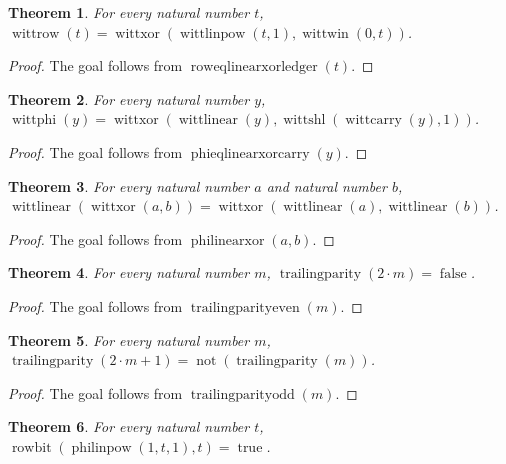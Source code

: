 \documentclass[11pt]{article}
\newtheorem{theorem}{Theorem}[section]
\theoremstyle{definition}
\begin{document}
\begin{theorem}
\label{ll:observations:row-eq-linear-xor-ledger}
For every natural number \(t\), \(\operatorname{wittrow}(t) = \operatorname{wittxor}(\operatorname{wittlinpow}(t, 1), \operatorname{wittwin}(0, t))\).
\end{theorem}
\begin{proof}
The goal follows from \(\operatorname{roweqlinearxorledger}(t)\).
\end{proof}
\begin{theorem}
\label{ll:observations:phi-eq-linear-xor-carry}
For every natural number \(y\), \(\operatorname{wittphi}(y) = \operatorname{wittxor}(\operatorname{wittlinear}(y), \operatorname{wittshl}(\operatorname{wittcarry}(y), 1))\).
\end{theorem}
\begin{proof}
The goal follows from \(\operatorname{phieqlinearxorcarry}(y)\).
\end{proof}
\begin{theorem}
\label{ll:observations:phi-linear-xor}
For every natural number \(a\) and natural number \(b\), \(\operatorname{wittlinear}(\operatorname{wittxor}(a, b)) = \operatorname{wittxor}(\operatorname{wittlinear}(a), \operatorname{wittlinear}(b))\).
\end{theorem}
\begin{proof}
The goal follows from \(\operatorname{philinearxor}(a, b)\).
\end{proof}
\begin{theorem}
\label{ll:observations:trailing-parity-even}
For every natural number \(m\), \(\operatorname{trailingparity}(2 \cdot m) = \operatorname{false}\).
\end{theorem}
\begin{proof}
The goal follows from \(\operatorname{trailingparityeven}(m)\).
\end{proof}
\begin{theorem}
\label{ll:observations:trailing-parity-odd}
For every natural number \(m\), \(\operatorname{trailingparity}(2 \cdot m + 1) = \operatorname{not}(\operatorname{trailingparity}(m))\).
\end{theorem}
\begin{proof}
The goal follows from \(\operatorname{trailingparityodd}(m)\).
\end{proof}
\begin{theorem}
\label{ll:observations:linear-center}
For every natural number \(t\), \(\operatorname{rowbit}(\operatorname{philinpow}(1, t, 1), t) = \operatorname{true}\).
\end{theorem}
\end{document}
